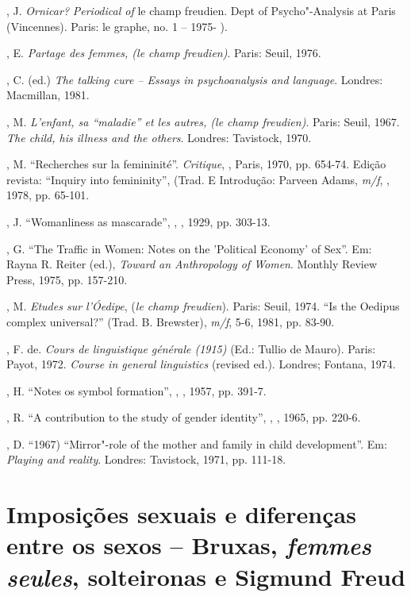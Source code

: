 , J. \emph{Ornicar?} \emph{Periodical of} le champ freudien. Dept
of Psycho"-Analysis at Paris  (Vincennes). Paris: le graphe, no. 1 --
1975- ).

, E. \emph{Partage des femmes, (le champ freudien)}.
Paris: Seuil, 1976.

, C. (ed.) \emph{The talking cure -- Essays in psychoanalysis and
language}. Londres: Macmillan, 1981.

, M. \emph{L'enfant, sa ``maladie'' et les autres, (le champ
freudien)}. Paris: Seuil, 1967. \emph{The child, his illness and the
others}. Londres: Tavistock, 1970.

, M. ``Recherches sur la femininité''. \emph{Critique}, ,
Paris, 1970, pp. 654-74. Edição revista: ``Inquiry into femininity'',
(Trad. E Introdução: Parveen Adams, \emph{m/f}, , 1978, pp. 65-101.

, J. ``Womanliness as mascarade'', \emph{}, , 1929, pp.
303-13.

, G. ``The Traffic in Women: Notes on the 'Political Economy' of
Sex''. Em: Rayna R. Reiter (ed.), \emph{Toward an Anthropology of
Women}. Monthly Review Press, 1975, pp. 157-210.

, M. \emph{Etudes sur l'Óedipe}, (\emph{le champ freudien}).
Paris: Seuil, 1974. ``Is the Oedipus complex universal?'' (Trad. B.
Brewster), \emph{m/f}, 5-6, 1981, pp. 83-90.

, F. de. \emph{Cours de linguistique générale (1915)} (Ed.:
Tullio de Mauro). Paris: Payot, 1972. \emph{Course in general
linguistics} (revised ed.). Londres; Fontana, 1974.

, H. ``Notes os symbol formation'', \emph{}, , 1957,
pp. 391-7.

, R. ``A contribution to the study of gender identity'',
\emph{}, , 1965, pp. 220-6.

, D. ``1967) ``Mirror"-role of the mother and family in child
development''. Em: \emph{Playing and reality}. Londres: Tavistock, 1971,
pp. 111-18.

\chapter*{Imposições sexuais e diferenças entre os sexos -- Bruxas,
\emph{femmes seules}, solteironas e Sigmund Freud}


